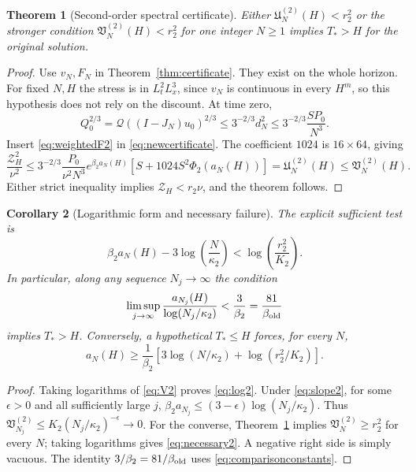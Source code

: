 \documentclass[11pt,a4paper]{article}
\newtheorem{theorem}{Theorem}[section]
\newtheorem{corollary}[theorem]{Corollary}
\theoremstyle{definition}\newtheorem{definition}[theorem]{Definition}
\theoremstyle{remark}\newtheorem{remark}[theorem]{Remark}
\newcommand{\Q}{\mathcal Q}
\newcommand{\Zcert}{\mathscr Z}
\numberwithin{equation}{section}
\begin{document}
\begin{theorem}[Second-order spectral certificate]\label{thm:index2}
Either $\mathfrak U_N^{(2)}(H)<r_2^2$ or the stronger condition $\mathfrak V_N^{(2)}(H)<r_2^2$ for one integer $N\ge1$ implies $T_*>H$ for the original solution.
\end{theorem}
\begin{proof}
Use $v_N,F_N$ in Theorem~\ref{thm:certificate}. They exist on the whole horizon. For fixed $N,H$ the stress is in $L^2_tL^3_x$, since $v_N$ is continuous in every $H^m$, so this hypothesis does not rely on the discount. At time zero,
\[
 Q_0^{2/3}=\Q((I-J_N)u_0)^{2/3}
 \le3^{-2/3}d_N^2\le3^{-2/3}\frac{SP_0}{N^3}.
\]
Insert \eqref{eq:weightedF2} in \eqref{eq:newcertificate}. The coefficient $1024$ is $16\times64$, giving
\[
 \frac{\Zcert_H^2}{\nu^2}
 \le3^{-2/3}\frac{P_0}{\nu^2N^3}e^{\beta_2a_N(H)}
          [S+1024S^2\Phi_2(a_N(H))]
 =\mathfrak U_N^{(2)}(H)\le\mathfrak V_N^{(2)}(H).
\]
Either strict inequality implies $\Zcert_H<r_2\nu$, and the theorem follows.
\end{proof}

\begin{corollary}[Logarithmic form and necessary failure]\label{cor:log2}
The explicit sufficient test is
\begin{equation}\label{eq:log2}
 \beta_2a_N(H)-3\log\left(\frac{N}{\kappa_2}\right)
 <\log\left(\frac{r_2^2}{K_2}\right).
\end{equation}
In particular, along any sequence $N_j\to\infty$ the condition
\begin{equation}\label{eq:slope2}
 \limsup_{j\to\infty}\frac{a_{N_j}(H)}{\log(N_j/\kappa_2)}
 <\frac3{\beta_2}=\frac{81}{\beta_{\rm old}}
\end{equation}
implies $T_*>H$. Conversely, a hypothetical $T_*\le H$ forces, for every $N$,
\begin{equation}\label{eq:necessary2}
 a_N(H)\ge\frac1{\beta_2}
 \left[3\log(N/\kappa_2)+\log(r_2^2/K_2)\right].
\end{equation}
\end{corollary}
\begin{proof}
Taking logarithms of \eqref{eq:V2} proves \eqref{eq:log2}. Under \eqref{eq:slope2}, for some $\epsilon>0$ and all sufficiently large $j$,
$\beta_2a_{N_j}\le(3-\epsilon)\log(N_j/\kappa_2)$. Thus
$\mathfrak V_{N_j}^{(2)}\le K_2(N_j/\kappa_2)^{-\epsilon}\to0$.
For the converse, Theorem~\ref{thm:index2} implies $\mathfrak V_N^{(2)}\ge r_2^2$ for every $N$; taking logarithms gives \eqref{eq:necessary2}. A negative right side is simply vacuous. The identity $3/\beta_2=81/\beta_{\rm old}$ uses \eqref{eq:comparisonconstants}.
\end{proof}
\end{document}
